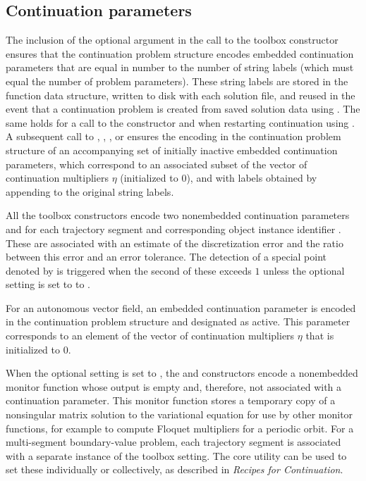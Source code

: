 \subsection{Continuation parameters}

The inclusion of the  optional argument in the call to the  toolbox constructor ensures that the continuation problem structure encodes embedded continuation parameters that are equal in number to the number of string labels (which must equal the number of problem parameters). These string labels are stored in the function data structure, written to disk with each solution file, and reused in the event that a continuation problem is created from saved solution data using . The same holds for a call to the  constructor and when restarting continuation using . A subsequent call to , , , or  ensures the encoding in the continuation problem structure of an accompanying set of initially inactive embedded continuation parameters, which correspond to an associated subset of the vector of continuation multipliers $\eta$ (initialized to $0$), and with labels obtained by appending  to the original string labels.

All the  toolbox constructors encode two nonembedded continuation parameters  and  for each trajectory segment and corresponding object instance identifier . These are associated with an estimate of the discretization error and the ratio between this error and an error tolerance. The detection of  a special point denoted by  is triggered when the second of these exceeds $1$ unless the optional setting  is set to to .

For an autonomous vector field, an embedded continuation parameter  is encoded in the continuation problem structure and designated as active. This parameter corresponds to an element of the vector of continuation multipliers $\eta$ that is initialized to $0$.

When the optional setting  is set to , the  and  constructors encode a nonembedded monitor function whose output is empty and, therefore, not associated with a continuation parameter. This monitor function stores a temporary copy of a nonsingular matrix solution to the variational equation for use by other monitor functions, for example to compute Floquet multipliers for a periodic orbit. For a multi-segment boundary-value problem, each trajectory segment is associated with a separate instance of the  toolbox setting. The  core utility can be used to set these individually or collectively, as described in \emph{Recipes for Continuation}.

